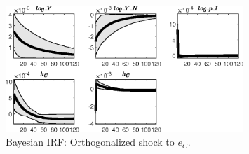 \begin{figure}[H]
\centering 
\includegraphics[width=0.80\textwidth]{BRS_growth_ext_comovement/Output/BRS_growth_ext_comovement_Bayesian_IRF_e_C_2}
\caption{Bayesian IRF: Orthogonalized shock to ${e_C}$.}
\label{Fig:BayesianIRF:e_C:2}
\end{figure}
 
